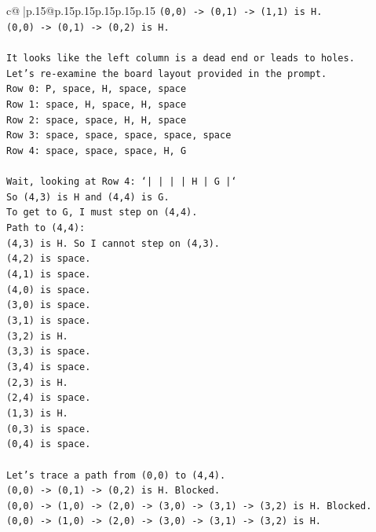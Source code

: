 \documentclass{article}
\begin{document}
{\begin{supertabular}{c@{$\;$}|p{.15\linewidth}@{}p{.15\linewidth}p{.15\linewidth}p{.15\linewidth}p{.15\linewidth}p{.15\linewidth}}
{{{\texttt{(0,0) {-}> (0,1) {-}> (1,1) is H.} \\
\texttt{(0,0) {-}> (0,1) {-}> (0,2) is H.} \\
\\ 
\texttt{It looks like the left column is a dead end or leads to holes.} \\
\texttt{Let's re{-}examine the board layout provided in the prompt.} \\
\texttt{Row 0: P, space, H, space, space} \\
\texttt{Row 1: space, H, space, H, space} \\
\texttt{Row 2: space, space, H, H, space} \\
\texttt{Row 3: space, space, space, space, space} \\
\texttt{Row 4: space, space, space, H, G} \\
\\ 
\texttt{Wait, looking at Row 4: `|     |     |     |  H  |  G  |`} \\
\texttt{So (4,3) is H and (4,4) is G.} \\
\texttt{To get to G, I must step on (4,4).} \\
\texttt{Path to (4,4):} \\
\texttt{(4,3) is H. So I cannot step on (4,3).} \\
\texttt{(4,2) is space.} \\
\texttt{(4,1) is space.} \\
\texttt{(4,0) is space.} \\
\texttt{(3,0) is space.} \\
\texttt{(3,1) is space.} \\
\texttt{(3,2) is H.} \\
\texttt{(3,3) is space.} \\
\texttt{(3,4) is space.} \\
\texttt{(2,3) is H.} \\
\texttt{(2,4) is space.} \\
\texttt{(1,3) is H.} \\
\texttt{(0,3) is space.} \\
\texttt{(0,4) is space.} \\
\\ 
\texttt{Let's trace a path from (0,0) to (4,4).} \\
\texttt{(0,0) {-}> (0,1) {-}> (0,2) is H. Blocked.} \\
\texttt{(0,0) {-}> (1,0) {-}> (2,0) {-}> (3,0) {-}> (3,1) {-}> (3,2) is H. Blocked.} \\
\texttt{(0,0) {-}> (1,0) {-}> (2,0) {-}> (3,0) {-}> (3,1) {-}> (3,2) is H.} \\
}}}
\end{supertabular}}
\end{document}
